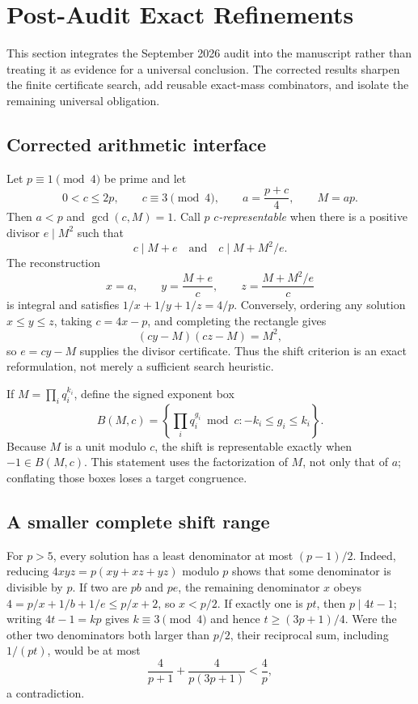 \section{Post-Audit Exact Refinements}\label{sec:v5-refinements}

This section integrates the September 2026 audit into the manuscript rather
than treating it as evidence for a universal conclusion.  The corrected
results sharpen the finite certificate search, add reusable exact-mass
combinators, and isolate the remaining universal obligation.

\subsection{Corrected arithmetic interface}

Let $p\equiv1\pmod4$ be prime and let
\[
  0<c\le2p,\qquad c\equiv3\pmod4,\qquad
  a=\frac{p+c}{4},\qquad M=ap.
\]
Then $a<p$ and $\gcd(c,M)=1$.  Call $p$ \emph{$c$-representable} when
there is a positive divisor $e\mid M^2$ such that
\[
  c\mid M+e
  \quad\text{and}\quad
  c\mid M+M^2/e.
\]
The reconstruction
\[
  x=a,\qquad y=\frac{M+e}{c},\qquad
  z=\frac{M+M^2/e}{c}
\]
is integral and satisfies $1/x+1/y+1/z=4/p$.  Conversely, ordering any
solution $x\le y\le z$, taking $c=4x-p$, and completing the rectangle gives
\[
  (cy-M)(cz-M)=M^2,
\]
so $e=cy-M$ supplies the divisor certificate.  Thus the shift criterion is
an exact reformulation, not merely a sufficient search heuristic.

If $M=\prod_i q_i^{k_i}$, define the signed exponent box
\[
  B(M,c)=\left\{\prod_i q_i^{g_i}\bmod c:-k_i\le g_i\le k_i\right\}.
\]
Because $M$ is a unit modulo $c$, the shift is representable exactly when
$-1\in B(M,c)$.  This statement uses the factorization of $M$, not only that
of $a$; conflating those boxes loses a target congruence.

\subsection{A smaller complete shift range}

For $p>5$, every solution has a least denominator at most $(p-1)/2$.
Indeed, reducing $4xyz=p(xy+xz+yz)$ modulo $p$ shows that some denominator
is divisible by $p$.  If two are $pb$ and $pe$, the remaining denominator
$x$ obeys $4=p/x+1/b+1/e\le p/x+2$, so $x<p/2$.  If exactly one is $pt$,
then $p\mid4t-1$; writing $4t-1=kp$ gives $k\equiv3\pmod4$ and hence
$t\ge(3p+1)/4$.  Were the other two denominators both larger than $p/2$,
their reciprocal sum, including $1/(pt)$, would be at most
\[
  \frac4{p+1}+\frac4{p(3p+1)}<\frac4p,
\]
a contradiction.

